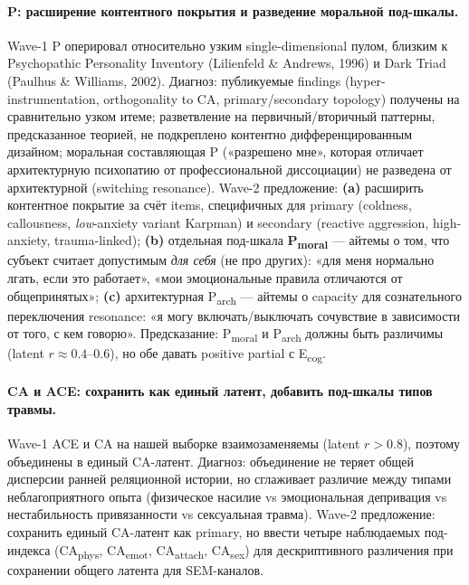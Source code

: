 \paragraph{P: расширение контентного покрытия и разведение моральной под-шкалы.} Wave-1 P оперировал относительно узким single-dimensional пулом, близким к Psychopathic Personality Inventory (Lilienfeld \& Andrews, 1996) и Dark Triad (Paulhus \& Williams, 2002). Диагноз: публикуемые findings (hyper-instrumentation, orthogonality to CA, primary/secondary topology) получены на сравнительно узком итеме; разветвление на первичный/вторичный паттерны, предсказанное теорией, не подкреплено контентно дифференцированным дизайном; моральная составляющая P («разрешено мне», которая отличает архитектурную психопатию от профессиональной диссоциации) не разведена от архитектурной (switching resonance). Wave-2 предложение: \textbf{(a)} расширить контентное покрытие за счёт items, специфичных для primary (coldness, callousness, \emph{low}-anxiety variant Karpman) и secondary (reactive aggression, high-anxiety, trauma-linked); \textbf{(b)} отдельная под-шкала \textbf{P\textsubscript{moral}} --- айтемы о том, что субъект считает допустимым \emph{для себя} (не про других): «для меня нормально лгать, если это работает», «мои эмоциональные правила отличаются от общепринятых»; \textbf{(c)} архитектурная P\textsubscript{arch} --- айтемы о capacity для сознательного переключения resonance: «я могу включать/выключать сочувствие в зависимости от того, с кем говорю». Предсказание: P\textsubscript{moral} и P\textsubscript{arch} должны быть различимы (latent $r \approx 0.4$--$0.6$), но обе давать positive partial с E\textsubscript{cog}.

\paragraph{CA и ACE: сохранить как единый латент, добавить под-шкалы типов травмы.} Wave-1 ACE и CA на нашей выборке взаимозаменяемы (latent $r > 0.8$), поэтому объединены в единый CA-латент. Диагноз: объединение не теряет общей дисперсии ранней реляционной истории, но сглаживает различие между типами неблагоприятного опыта (физическое насилие vs эмоциональная депривация vs нестабильность привязанности vs сексуальная травма). Wave-2 предложение: сохранить единый CA-латент как primary, но ввести четыре наблюдаемых под-индекса (CA\textsubscript{phys}, CA\textsubscript{emot}, CA\textsubscript{attach}, CA\textsubscript{sex}) для дескриптивного различения при сохранении общего латента для SEM-каналов.

